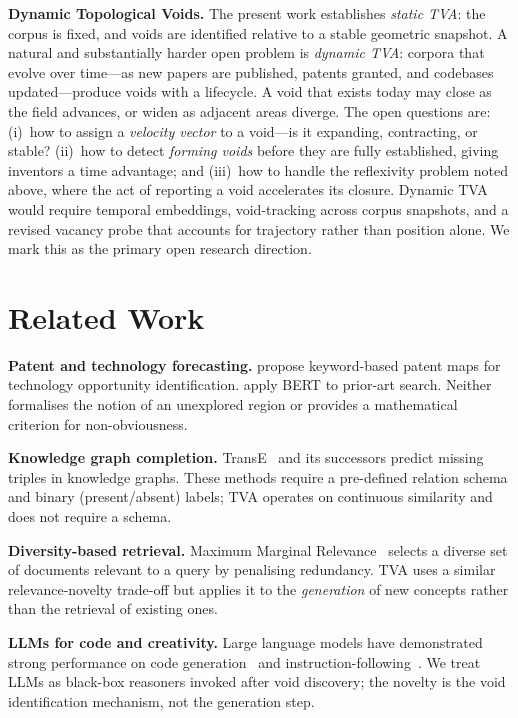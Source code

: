 \documentclass[11pt,twocolumn]{article}
\begin{document}
\textbf{Dynamic Topological Voids.}
The present work establishes \emph{static TVA}: the corpus is fixed,
and voids are identified relative to a stable geometric snapshot.
A natural and substantially harder open problem is \emph{dynamic TVA}:
corpora that evolve over time---as new papers are published, patents
granted, and codebases updated---produce voids with a lifecycle.
A void that exists today may close as the field advances, or widen
as adjacent areas diverge.  The open questions are:
(i)~how to assign a \emph{velocity vector} to a void---is it expanding,
contracting, or stable?
(ii)~how to detect \emph{forming voids} before they are fully
established, giving inventors a time advantage; and
(iii)~how to handle the reflexivity problem noted above, where the act
of reporting a void accelerates its closure.
Dynamic TVA would require temporal embeddings, void-tracking across
corpus snapshots, and a revised vacancy probe that accounts for
trajectory rather than position alone.
We mark this as the primary open research direction.

\section{Related Work}
\label{sec:related}

\textbf{Patent and technology forecasting.}
\cite{lee2007patent} propose keyword-based patent maps for technology
opportunity identification.  \cite{srinivasan2021patentbert} apply
BERT to prior-art search.  Neither formalises the notion of an
unexplored region or provides a mathematical criterion for
non-obviousness.

\textbf{Knowledge graph completion.}
TransE~\cite{bordes2013transe} and its successors predict missing
triples in knowledge graphs.  These methods require a pre-defined
relation schema and binary (present/absent) labels; TVA operates on
continuous similarity and does not require a schema.

\textbf{Diversity-based retrieval.}
Maximum Marginal Relevance~\cite{carbonell1998mmr} selects a diverse
set of documents relevant to a query by penalising redundancy.  TVA
uses a similar relevance-novelty trade-off but applies it to the
\emph{generation} of new concepts rather than the retrieval of existing
ones.

\textbf{LLMs for code and creativity.}
Large language models have demonstrated strong performance on code
generation~\cite{nijkamp2022codegen,chen2021codex} and
instruction-following~\cite{wang2023selfinstruct}.  We treat LLMs as
black-box reasoners invoked after void discovery; the novelty is the
void identification mechanism, not the generation step.
\end{document}
